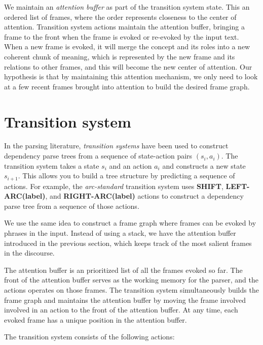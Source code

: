 \documentclass[11pt,a4paper]{article}
\begin{document}
We maintain an \emph{attention buffer} as part of the transition system state.
This an ordered list of frames, where the order represents closeness to the
center of attention. Transition system actions maintain the attention buffer, bringing
a frame to the front when the frame is evoked or re-evoked by the input text.
When a new frame is evoked, it will merge the concept and its roles into a new
coherent chunk of meaning, which is represented by the new frame and its
relations to other frames, and this will become the new center of attention.
Our hypothesis is that by maintaining this attention mechanism, we only need to
look at a few recent frames brought into attention to build the desired
frame graph.

\section{Transition system}
\label{sec:ts}

In the parsing literature, \emph{transition systems} have been
used to construct dependency parse trees from a sequence of state-action pairs
$(s_i,a_i)$. The transition system takes a state $s_i$ and an action $a_i$ and
constructs a new state $s_{i+1}$. This allows you to build a tree structure by
predicting a sequence of actions. For example, the \emph{arc-standard}
transition system \cite{nivre2006} uses {\bf SHIFT}, {\bf LEFT-ARC(label)}, and
{\bf RIGHT-ARC(label)} actions to construct a dependency parse tree from a
sequence of those actions.

We use the same idea to construct a frame graph where frames can be
evoked by phrases in the input. Instead of using a stack, we have the attention
buffer introduced in the previous section, which keeps track of the most salient
frames in the discourse.

The attention buffer is an prioritized list of all the
frames evoked so far. The front of the attention buffer serves as the working
memory for the parser, and the actions operates on those frames. The transition
system simultaneously builds the frame graph and maintains the attention buffer
by moving the frame involved involved in an action to the front of the attention
buffer. At any time, each evoked frame has a unique position in the attention
buffer.

The transition system consists of the following actions:
\end{document}
